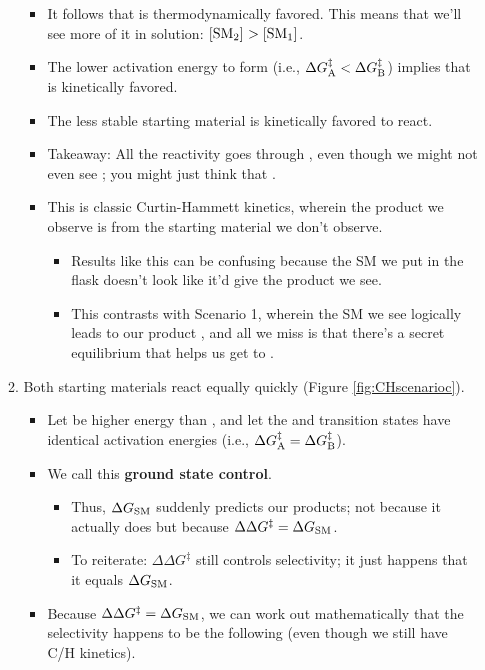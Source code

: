 \documentclass[../notes.tex]{subfiles}
\begin{document}
\begin{itemize}
\begin{enumerate}
\begin{itemize}
            \item It follows that  is thermodynamically favored. This means that we'll see more of it in solution: $\cnc{SM2}>\cnc{SM1}$.
            \item The lower activation energy to form  (i.e., $\Delta G_{\ce{A}}^\ddagger<\Delta G_{\ce{B}}^\ddagger$) implies that  is kinetically favored.
            \item The less stable starting material is kinetically favored to react.
            \item Takeaway: All the reactivity goes through , even though we might not even see ; you might just think that .
            \item This is classic Curtin-Hammett kinetics, wherein the product we observe is from the starting material we don't observe.
            \begin{itemize}
                \item Results like this can be confusing because the SM we put in the flask doesn't look like it'd give the product we see.
                \item This contrasts with Scenario 1, wherein the SM we see logically leads to our product , and all we miss is that there's a secret equilibrium that helps us get to .
            \end{itemize}
        \end{itemize}
        \item Both starting materials react equally quickly (Figure \ref{fig:CHscenarioc}).
        \begin{itemize}
            \item Let  be higher energy than , and let the  and  transition states have identical activation energies (i.e., $\Delta G_{\ce{A}}^\ddagger=\Delta G_{\ce{B}}^\ddagger$).
            \item We call this \textbf{ground state control}.
            \begin{itemize}
                \item Thus, $\Delta G_{\ce{SM}}$ suddenly predicts our products; not because it actually does but because $\Delta\Delta G^\ddagger=\Delta G_{\ce{SM}}$.
                \item To reiterate: $\Delta\Delta G^\ddagger$ still controls selectivity; it just happens that it equals $\Delta G_{\ce{SM}}$.
            \end{itemize}
            \item Because $\Delta\Delta G^\ddagger=\Delta G_{\ce{SM}}$, we can work out mathematically that the selectivity happens to be the following (even though we still have C/H kinetics).

\end{itemize}
\end{enumerate}
\end{itemize}
\end{document}
